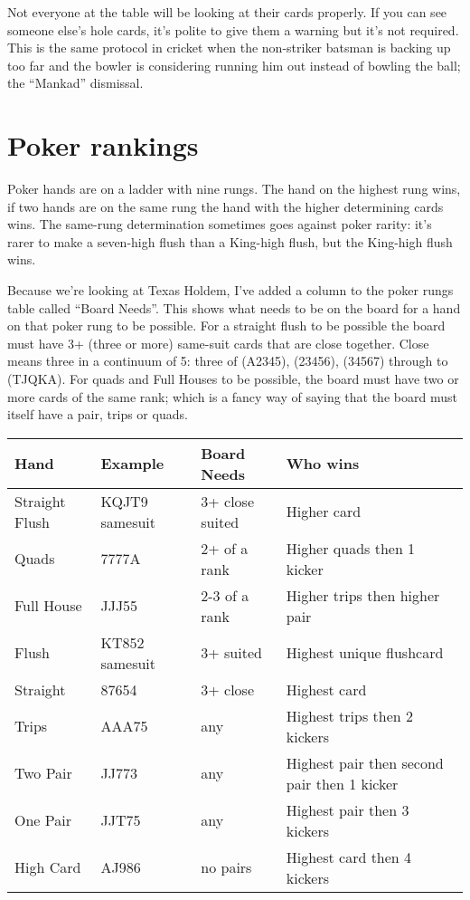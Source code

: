 Not everyone at the table will be looking at their cards properly. If
you can see someone else's hole cards, it's polite to give them a
warning but it's not required. This is the same protocol in cricket
when the non-striker batsman is backing up too far and the bowler is
considering running him out instead of bowling the ball; the
``Mankad'' dismissal.

\section{Poker rankings}

Poker hands are on a ladder with nine rungs. The hand on
the highest rung wins, if two hands are on the same rung the hand with
the higher determining cards wins. The same-rung determination
sometimes goes against poker rarity: it's rarer to make a seven-high
flush than a King-high flush, but the King-high flush wins.

Because we're looking at Texas Holdem, I've added a column to the
poker rungs table called ``Board Needs''. This shows what needs to be
on the board for a hand on that poker rung to be possible. For a
straight flush to be possible the board must have 3+ (three or more)
same-suit cards that are close together. Close means three in a
continuum of 5: three of (A2345), (23456), (34567) through to
(TJQKA). For quads and Full Houses to be possible, the board must have
two or more cards of the same rank; which is a fancy way of saying
that the board must itself have a pair, trips or quads.

\begin{tabular}{|l|l|l|l|} \hline
Hand            & Example   & Board Needs    & Who wins \\ \hline
Straight Flush  & KQJT9 samesuit     & 3+ close suited &
Higher card \\ \hline
Quads           & 7777A     & 2+ of a rank   & Higher quads then
1 kicker \\ \hline
Full House      & JJJ55     & 2-3 of a rank  & Higher trips then
higher pair \\ \hline
Flush           & KT852 samesuit & 3+ suited & Highest unique flushcard
\\ \hline
Straight        & 87654     & 3+ close       & Highest card \\ \hline
Trips           & AAA75     & any            & Highest trips then 2
kickers \\ \hline
Two Pair        & JJ773     & any            & Highest pair then
second pair then 1 kicker \\ \hline
One Pair        & JJT75     & any            & Highest pair then 3
kickers \\ \hline
High Card       & AJ986     & no pairs       & Highest card then 4
kickers \\ \hline
\end{tabular}

